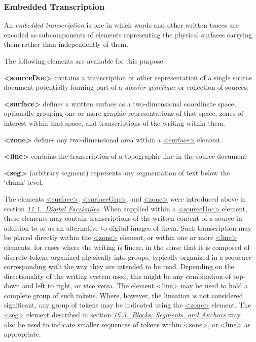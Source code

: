 \subsubsection[{Embedded Transcription}]{Embedded Transcription}\label{PHZLAB}\par
An \textit{embedded transcription} is one in which words and other written traces are encoded as subcomponents of elements representing the physical surfaces carrying them rather than independently of them.\par
The following elements are available for this purpose: 
\begin{sansreflist}
  
\item [\textbf{<sourceDoc>}] contains a transcription or other representation of a single source document potentially forming part of a \textit{dossier génétique} or collection of sources.
\item [\textbf{<surface>}] defines a written surface as a two-dimensional coordinate space, optionally grouping one or more graphic representations of that space, zones of interest within that space, and transcriptions of the writing within them.
\item [\textbf{<zone>}] defines any two-dimensional area within a \hyperref[TEI.surface]{<surface>} element.
\item [\textbf{<line>}] contains the transcription of a topographic line in the source document
\item [\textbf{<seg>}] (arbitrary segment) represents any segmentation of text below the ‘chunk’ level.
\end{sansreflist}
\par
The elements \hyperref[TEI.surface]{<surface>}, \hyperref[TEI.surfaceGrp]{<surfaceGrp>}, and \hyperref[TEI.zone]{<zone>} were introduced above in section \textit{\hyperref[PHFAX]{11.1.\ Digital Facsimiles}}. When supplied within a \hyperref[TEI.sourceDoc]{<sourceDoc>} element, these elements may contain transcriptions of the written content of a source in addition to or as an alternative to digital images of them. Such transcription may be placed directly within the \hyperref[TEI.zone]{<zone>} element, or within one or more \hyperref[TEI.line]{<line>} elements, for cases where the writing is linear, in the sense that it is composed of discrete tokens organized physically into groups, typically organized in a sequence corresponding with the way they are intended to be read. Depending on the directionality of the writing system used, this might be any combination of top-down and left to right, or vice versa. The element \hyperref[TEI.line]{<line>} may be used to hold a complete group of such tokens. Where, however, the lineation is not considered significant, any group of tokens may be indicated using the \hyperref[TEI.zone]{<zone>} element. The \hyperref[TEI.seg]{<seg>} element described in section \textit{\hyperref[SASE]{16.3.\ Blocks, Segments, and Anchors}} may also be used to indicate smaller sequences of tokens within \hyperref[TEI.zone]{<zone>}, or \hyperref[TEI.line]{<line>} as appropriate.\par
